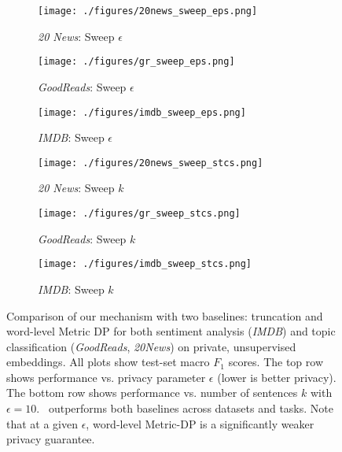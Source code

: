 \begin{figure*}[ht]
\centering 
   \begin{subfigure}[b]{0.30\linewidth}
       \centering
       \texttt{[image: ./figures/20news\_sweep\_eps.png]}
      \vspace{-0.15cm}
       \caption{\textit{20 News}: Sweep $\epsilon$}
       \label{fig:eps:tnews}
    \end{subfigure}%
    \begin{subfigure}[b]{0.30\linewidth}
       \centering
       \texttt{[image: ./figures/gr\_sweep\_eps.png]}
      \vspace{-0.15cm}
       \caption{\textit{GoodReads}: Sweep $\epsilon$}
       \label{fig:eps:gr}
    \end{subfigure}%
    \begin{subfigure}[b]{0.30\linewidth}
       \centering
       \texttt{[image: ./figures/imdb\_sweep\_eps.png]}
      \vspace{-0.15cm}
       \caption{\textit{IMDB}: Sweep $\epsilon$}
       \label{fig:eps:imdb}
    \end{subfigure}%
    \hfill
    \begin{subfigure}[b]{0.30\linewidth}
       \centering
       \texttt{[image: ./figures/20news\_sweep\_stcs.png]}
      \vspace{-0.15cm}
       \caption{\textit{20 News}: Sweep $k$}
       \label{fig:k:tnews}
    \end{subfigure}%
    \begin{subfigure}[b]{0.30\linewidth}
       \centering
       \texttt{[image: ./figures/gr\_sweep\_stcs.png]}
      \vspace{-0.15cm}
       \caption{\textit{GoodReads}: Sweep $k$}
       \label{fig:k:gr}
    \end{subfigure}%
    \begin{subfigure}[b]{0.30\linewidth}
       \centering
       \texttt{[image: ./figures/imdb\_sweep\_stcs.png]}
      \vspace{-0.15cm}
       \caption{\textit{IMDB}: Sweep $k$}
       \label{fig:k:imdb}
    \end{subfigure}%
    \caption{Comparison of our mechanism with two baselines: truncation \cite{clifton} and word-level Metric DP \cite{metricdp} for both sentiment analysis (\emph{IMDB}) and topic classification (\emph{GoodReads}, \emph{20News}) on private, unsupervised embeddings. All plots show test-set macro $F_1$ scores. The top row shows performance vs. privacy parameter $\epsilon$ (lower is better privacy). The bottom row shows performance vs. number of sentences $k$ with $\epsilon = 10$. \technique\ outperforms both baselines across datasets and tasks. Note that at a given $\epsilon$, word-level Metric-DP is a significantly weaker privacy guarantee.}
\end{figure*}
